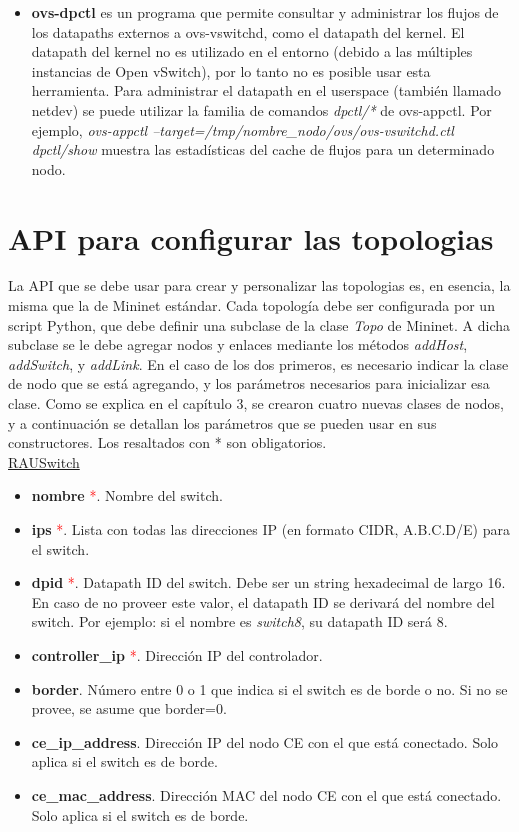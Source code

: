 \begin{itemize}
	\item \textbf{ovs-dpctl} \cite{ovs-dpctl} es un programa que permite consultar y administrar los flujos de los datapaths externos a ovs-vswitchd, como el datapath del kernel. El datapath del kernel no es utilizado en el entorno (debido a las múltiples instancias de Open vSwitch), por lo tanto no es posible usar esta herramienta. Para administrar el datapath en el userspace (también llamado netdev) se puede utilizar la familia de comandos \textit{dpctl/*} de ovs-appctl. Por ejemplo, \textit{ovs-appctl  --target=/tmp/nombre\_nodo/ovs/ovs-vswitchd.ctl dpctl/show} muestra las estadísticas del cache de flujos para un determinado nodo.
\end{itemize}

\section{API para configurar las topologias}
La API que se debe usar para crear y personalizar las topologias es, en esencia, la misma que la de Mininet estándar. Cada topología debe ser configurada por un script Python, que debe definir una subclase de la clase \textit{Topo} de Mininet. A dicha subclase se le debe agregar nodos y enlaces mediante los métodos \textit{addHost}, \textit{addSwitch}, y \textit{addLink}. En el caso de los dos primeros, es necesario indicar la clase de nodo que se está agregando, y los parámetros necesarios para inicializar esa clase. Como se explica en el capítulo 3, se crearon cuatro nuevas clases de nodos, y a continuación se detallan los parámetros que se pueden usar en sus constructores. Los resaltados con * son obligatorios. \\

\underline{RAUSwitch}
\begin{itemize}
	\item \textbf{nombre} \textcolor{red}{*}. Nombre del switch.
	\item \textbf{ips} \textcolor{red}{*}. Lista con todas las direcciones IP (en formato CIDR, A.B.C.D/E) para el switch.
	\item \textbf{dpid} \textcolor{red}{*}. Datapath ID del switch. Debe ser un string hexadecimal de largo 16. En caso de no proveer este valor, el datapath ID se derivará del nombre del switch. Por ejemplo: si el nombre es \textit{switch8}, su datapath ID será 8.
	\item \textbf{controller\_ip} \textcolor{red}{*}. Dirección IP del controlador.
	\item \textbf{border}. Número entre 0 o 1 que indica si el switch es de borde o no. Si no se provee, se asume que border=0.
	\item \textbf{ce\_ip\_address}. Dirección IP del nodo CE con el que está conectado. Solo aplica si el switch es de borde.
	\item \textbf{ce\_mac\_address}. Dirección MAC del nodo CE con el que está conectado. Solo aplica si el switch es de borde.
\end{itemize}

